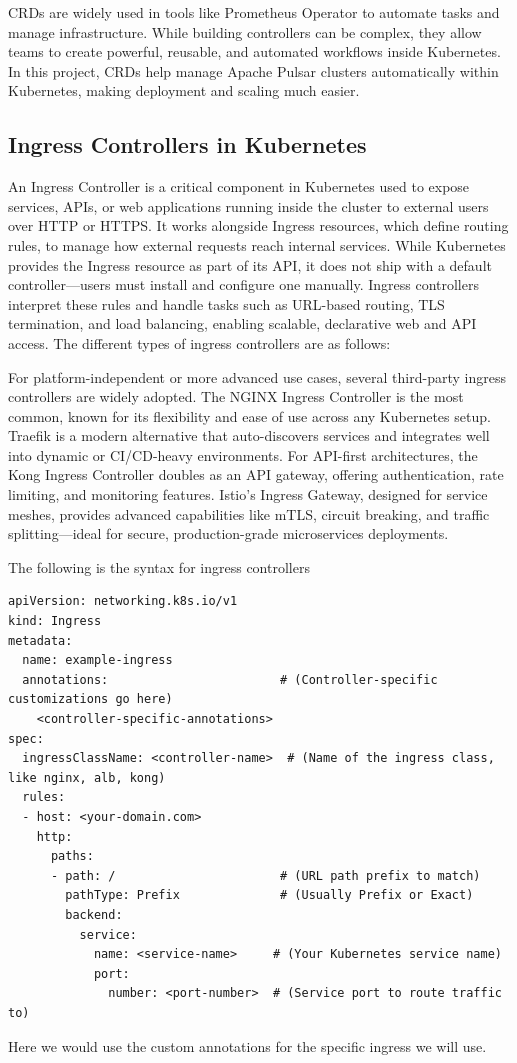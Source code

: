 CRDs are widely used in tools like Prometheus Operator to automate tasks and manage infrastructure. While building controllers can be complex, they allow teams to create powerful, reusable, and automated workflows inside Kubernetes. In this project, CRDs help manage Apache Pulsar clusters automatically within Kubernetes, making deployment and scaling much easier.

\subsection{Ingress Controllers in Kubernetes}
An Ingress Controller is a critical component in Kubernetes used to expose services, APIs, or web applications running inside the cluster to external users over HTTP or HTTPS. It works alongside Ingress resources, which define routing rules, to manage how external requests reach internal services. While Kubernetes provides the Ingress resource as part of its API, it does not ship with a default controller—users must install and configure one manually. Ingress controllers interpret these rules and handle tasks such as URL-based routing, TLS termination, and load balancing, enabling scalable, declarative web and API access. The different types of ingress controllers are as follows:



For platform-independent or more advanced use cases, several third-party ingress controllers are widely adopted. The NGINX Ingress Controller is the most common, known for its flexibility and ease of use across any Kubernetes setup. Traefik is a modern alternative that auto-discovers services and integrates well into dynamic or CI/CD-heavy environments. For API-first architectures, the Kong Ingress Controller doubles as an API gateway, offering authentication, rate limiting, and monitoring features. Istio's Ingress Gateway, designed for service meshes, provides advanced capabilities like mTLS, circuit breaking, and traffic splitting—ideal for secure, production-grade microservices deployments.

The following is the syntax for ingress controllers
\begin{lstlisting}[breaklines=true,basicstyle=\small\ttfamily,frame=single]
apiVersion: networking.k8s.io/v1
kind: Ingress
metadata:
  name: example-ingress
  annotations:                        # (Controller-specific customizations go here)
    <controller-specific-annotations>
spec:
  ingressClassName: <controller-name>  # (Name of the ingress class, like nginx, alb, kong)
  rules:
  - host: <your-domain.com>
    http:
      paths:
      - path: /                       # (URL path prefix to match)
        pathType: Prefix              # (Usually Prefix or Exact)
        backend:
          service:
            name: <service-name>     # (Your Kubernetes service name)
            port:
              number: <port-number>  # (Service port to route traffic to)
\end{lstlisting}
Here we would use the custom annotations for the specific ingress we will use.


